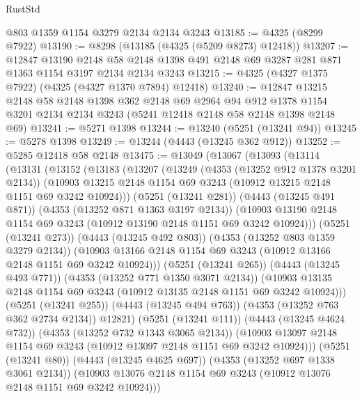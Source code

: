 \begin{lexlean}{RustStd}
\begin{coremodule}
    @803
    @1359
    @1154
    @3279
    @2134
    @2134
    @3243
@13185 := @4325 (@8299 @7922)
@13190 := @8298 (@13185 (@4325 (@5209 @8273) @12418))
@13207 := @12847
    @13190
    @2148
    @58
    @2148
    @1398
    @491
    @2148
    @69
    @3287
    @281
    @871
    @1363
    @1154
    @3197
    @2134
    @2134
    @3243
@13215 := @4325 (@4327 @1375 @7922) (@4325 (@4327 @1370 @7894) @12418)
@13240 := @12847
    @13215
    @2148
    @58
    @2148
    @1398
    @362
    @2148
    @69
    @2964
    @94
    @912
    @1378
    @1154
    @3201
    @2134
    @2134
    @3243
    (@5241 @12418 @2148 @58 @2148 @1398 @2148 @69)
@13241 := @5271 @1398
@13244 := @13240 (@5251 (@13241 @94))
@13245 := @5278 @1398
@13249 := @13244 (@4443 (@13245 @362 @912))
@13252 := @5285 @12418 @58 @2148
@13475 := @13049
    (@13067
      (@13093
        (@13114
          (@13131
            (@13152
              (@13183
                (@13207
                  (@13249
                    (@4353 (@13252 @912 @1378 @3201 @2134))
                    (@10903
                      @13215
                      @2148
                      @1154
                      @69
                      @3243
                      (@10912 @13215 @2148 @1151 @69 @3242 @10924)))
                  (@5251 (@13241 @281))
                  (@4443 (@13245 @491 @871))
                  (@4353 (@13252 @871 @1363 @3197 @2134))
                  (@10903
                    @13190
                    @2148
                    @1154
                    @69
                    @3243
                    (@10912 @13190 @2148 @1151 @69 @3242 @10924)))
                (@5251 (@13241 @273))
                (@4443 (@13245 @492 @803))
                (@4353 (@13252 @803 @1359 @3279 @2134))
                (@10903 @13166 @2148 @1154 @69 @3243 (@10912 @13166 @2148 @1151 @69 @3242 @10924)))
              (@5251 (@13241 @265))
              (@4443 (@13245 @493 @771))
              (@4353 (@13252 @771 @1350 @3071 @2134))
              (@10903 @13135 @2148 @1154 @69 @3243 (@10912 @13135 @2148 @1151 @69 @3242 @10924)))
            (@5251 (@13241 @255))
            (@4443 (@13245 @494 @763))
            (@4353 (@13252 @763 @362 @2734 @2134))
            @12821)
          (@5251 (@13241 @111))
          (@4443 (@13245 @4624 @732))
          (@4353 (@13252 @732 @1343 @3065 @2134))
          (@10903 @13097 @2148 @1154 @69 @3243 (@10912 @13097 @2148 @1151 @69 @3242 @10924)))
        (@5251 (@13241 @80))
        (@4443 (@13245 @4625 @697))
        (@4353 (@13252 @697 @1338 @3061 @2134))
        (@10903 @13076 @2148 @1154 @69 @3243 (@10912 @13076 @2148 @1151 @69 @3242 @10924)))

\end{coremodule}
\end{lexlean}
